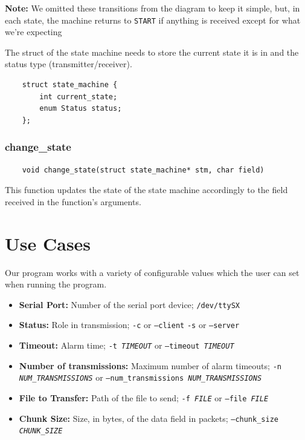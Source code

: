 \documentclass[11pt]{report}
\begin{document}
\textbf{Note:} We omitted these transitions from the diagram to keep it simple, but, in each state, the machine returns to \texttt{START} if anything is received except for what we're expecting

\hfill

The struct of the state machine needs to store the current state it is in and the status type (transmitter/receiver).
\begin{verbatim}
    struct state_machine {
        int current_state;
        enum Status status;
    };
\end{verbatim}

\subsection{change\_state}
\begin{verbatim}
    void change_state(struct state_machine* stm, char field)
\end{verbatim}

This function updates the state of the state machine accordingly to the field received in the function's arguments.

\chapter{Use Cases}

Our program works with a variety of configurable values which the user can set when running the program.

\begin{itemize}
    \item \textbf{Serial Port:} Number of the serial port device;
        \subitem \texttt{/dev/ttySX}
    \item \textbf{Status:} Role in transmission;
        \subitem \texttt{-c} or \texttt{--client}
        \subitem \texttt{-s} or \texttt{--server}
    \item \textbf{Timeout:} Alarm time;
        \subitem \texttt{-t \textit{TIMEOUT}} or \texttt{--timeout \textit{TIMEOUT}}
    \item \textbf{Number of transmissions:} Maximum number of alarm timeouts;
        \subitem \texttt{-n \textit{NUM\_TRANSMISSIONS}} or \texttt{--num\_transmissions \textit{NUM\_TRANSMISSIONS}}
    \item \textbf{File to Transfer:} Path of the file to send;
        \subitem \texttt{-f \textit{FILE}} or \texttt{--file \textit{FILE}}
    \item \textbf{Chunk Size:} Size, in bytes, of the data field in packets;
        \subitem \texttt{--chunk\_size \textit{CHUNK\_SIZE}} 
\end{itemize}
\end{document}
